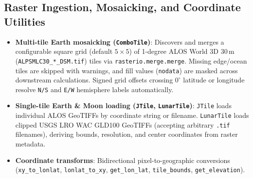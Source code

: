 \documentclass[11pt,letterpaper]{article}
\begin{document}
\subsection{Raster Ingestion, Mosaicking, and Coordinate Utilities}
\begin{itemize}
  \item \textbf{Multi-tile Earth mosaicking (\texttt{ComboTile})}: Discovers and merges a configurable square grid (default $5\times 5$) of 1-degree ALOS World 3D 30\,m (\texttt{ALPSMLC30\_*\_DSM.tif}) tiles via \texttt{rasterio.merge.merge}. Missing edge/ocean tiles are skipped with warnings, and fill values (\texttt{nodata}) are masked across downstream calculations. Signed grid offsets crossing $0^\circ$ latitude or longitude resolve \texttt{N/S} and \texttt{E/W} hemisphere labels automatically.
  \item \textbf{Single-tile Earth \& Moon loading (\texttt{JTile}, \texttt{LunarTile})}: \texttt{JTile} loads individual ALOS GeoTIFFs by coordinate string or filename. \texttt{LunarTile} loads clipped USGS LRO WAC GLD100 GeoTIFFs (accepting arbitrary \texttt{.tif} filenames), deriving bounds, resolution, and center coordinates from raster metadata.
  \item \textbf{Coordinate transforms}: Bidirectional pixel-to-geographic conversions (\texttt{xy\_to\_lonlat}, \texttt{lonlat\_to\_xy}, \texttt{get\_lon\_lat}, \texttt{tile\_bounds}, \texttt{get\_elevation}).
\end{itemize}
\end{document}
